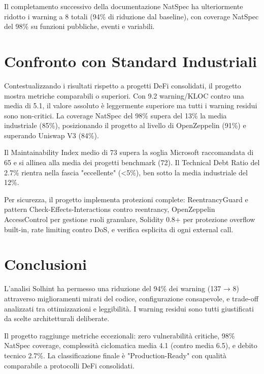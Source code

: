 \documentclass[12pt,a4paper]{article}
\begin{document}
Il completamento successivo della documentazione NatSpec ha ulteriormente ridotto i warning a 8 totali (94\% di riduzione dal baseline), con coverage NatSpec del 98\% su funzioni pubbliche, eventi e variabili.

\section{Confronto con Standard Industriali}

Contestualizzando i risultati rispetto a progetti DeFi consolidati, il progetto mostra metriche comparabili o superiori. Con 9.2 warning/KLOC contro una media di 5.1, il valore assoluto è leggermente superiore ma tutti i warning residui sono non-critici. La coverage NatSpec del 98\% supera del 13\% la media industriale (85\%), posizionando il progetto al livello di OpenZeppelin (91\%) e superando Uniswap V3 (84\%).

Il Maintainability Index medio di 73 supera la soglia Microsoft raccomandata di 65 e si allinea alla media dei progetti benchmark (72). Il Technical Debt Ratio del 2.7\% rientra nella fascia "eccellente" (<5\%), ben sotto la media industriale del 12\%.

Per sicurezza, il progetto implementa protezioni complete: ReentrancyGuard e pattern Check-Effects-Interactions contro reentrancy, OpenZeppelin AccessControl per gestione ruoli granulare, Solidity 0.8+ per protezione overflow built-in, rate limiting contro DoS, e verifica esplicita di ogni external call.

\section{Conclusioni}

L'analisi Solhint ha permesso una riduzione del 94\% dei warning (137 → 8) attraverso miglioramenti mirati del codice, configurazione consapevole, e trade-off analizzati tra ottimizzazioni e leggibilità. I warning residui sono tutti giustificati da scelte architetturali deliberate.

Il progetto raggiunge metriche eccezionali: zero vulnerabilità critiche, 98\% NatSpec coverage, complessità ciclomatica media 4.1 (contro media 6.5), e debito tecnico 2.7\%. La classificazione finale è "Production-Ready" con qualità comparabile a protocolli DeFi consolidati.
\end{document}
